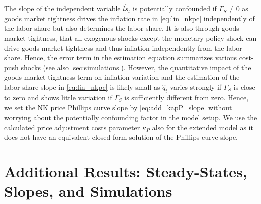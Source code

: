 \documentclass[12pt,3p,authoryear,review]{elsarticle}
\begin{document}
\begin{small}
The slope of the independent variable $\hat{ls}_t$ is potentially confounded if $\Gamma_S\neq0$ as goods market tightness drives the inflation rate in \eqref{eq:lin_nkpc} independently of the labor share but also determines the labor share. It is also through goods market tightness, that all exogenous shocks except the monetary policy shock can drive goods market tightness and thus inflation independently from the labor share. Hence, the error term in the estimation equation summarizes various cost-push shocks (see also \cref{sec:simulations}). However, the quantitative impact of the goods market tightness term on inflation variation and the estimation of the labor share slope in \eqref{eq:lin_nkpc} is likely small as $\hat{q}_t$ varies strongly if $\Gamma_S$ is close to zero and shows little variation if $\Gamma_S$ is sufficiently different from zero. Hence, we set the NK price Phillips curve slope by \eqref{eq:add_kapP_slope} without worrying about the potentially confounding factor in the model setup. We use the calculated price adjustment costs parameter $\kappa_P$ also for the extended model as it does not have an equivalent closed-form solution of the Phillips curve slope.%
\end{small}%
\clearpage%
\FloatBarrier%
\section{Additional Results: Steady-States, Slopes, and Simulations}\label{sec:additional}%
\end{document}
